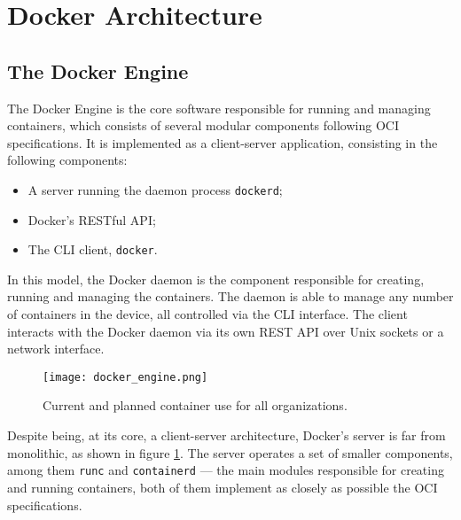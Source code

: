 \section{Docker Architecture}
\label{sec::arch}


\subsection{The Docker Engine}
\label{sec::arch:engine}
The Docker Engine is the core software responsible for running and managing containers, which consists of several modular components following \ac{OCI} specifications\cite{Docker-engine}. It is implemented as a client-server application, consisting in the following components:

\begin{itemize}
    \item A server running the daemon process \texttt{dockerd};
    \item Docker's \acs{REST}ful \ac{API};
    \item The \ac{CLI} client, \texttt{docker}.
\end{itemize}

In this model, the Docker daemon is the component responsible for creating, running and managing the containers. The daemon is able to manage any number of containers in the device, all controlled via the \ac{CLI} interface. The client interacts with the Docker daemon via its own \ac{REST} \ac{API} over Unix sockets or a network interface\cite{Poulton2020-ju}.

\begin{figure}[!htb]
    \centering
    \texttt{[image: docker\_engine.png]}
    \caption{Current and planned container use for all organizations.}
    \label{fig:docker-engine-server}
\end{figure}

Despite being, at its core, a client-server architecture, Docker's server is far from monolithic, as shown in figure \ref{fig:docker-engine-server}. The server operates a set of smaller components, among them \texttt{runc} and \texttt{containerd} --- the main modules responsible for creating and running containers, both of them implement as closely as possible the \ac{OCI} specifications\cite{Poulton2020-ju}.

